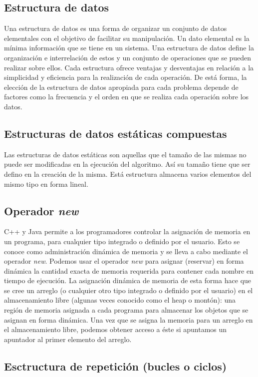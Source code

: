 \subsection{Estructura de datos}
Una estructura de datos es una forma de organizar un conjunto de datos elementales con el objetivo
de facilitar su manipulación. Un dato elemental es la mínima información que se tiene en un sistema.
Una estructura de datos define la organización e interrelación de estos y un conjunto de operaciones
que se pueden realizar sobre ellos. Cada estructura ofrece ventajas y desventajas en relación a la
simplicidad y eficiencia para la realización de cada operación. De está forma, la elección de la
estructura de datos apropiada para cada problema depende de factores como la frecuencia y el orden
en que se realiza cada operación sobre los datos.

\subsection{Estructuras de datos estáticas compuestas}
Las estructuras de datos estáticas son aquellas que el tamaño de las mismas no puede ser modificadas en la
ejecución del algoritmo. Así su tamaño tiene que ser defino en la creación de la misma. Está estructura almacena varios elementos del mismo tipo en forma lineal.

\subsection{Operador \emph{new}}
C++ y Java permite a los programadores controlar la asignación  de memoria en un programa, para cualquier tipo integrado o definido por el usuario. Esto se conoce como administración dinámica de memoria y se lleva a cabo
mediante el operador \emph{new}. Podemos usar el operador \emph{new} para asignar (reservar) en forma dinámica la cantidad exacta de memoria requerida para contener cada nombre en tiempo de ejecución. La
asignación dinámica de memoria de esta forma hace que se cree un arreglo (o cualquier otro tipo integrado o definido
por el usuario) en el almacenamiento libre (algunas veces conocido como el heap o montón): una región de memoria
asignada a cada programa para almacenar los objetos que se asignan en forma dinámica. Una vez que se asigna la memoria para un arreglo en el almacenamiento libre, podemos obtener acceso a éste si apuntamos un apuntador al primer elemento del arreglo.

\subsection{Esctructura de repetición (bucles o ciclos)}

